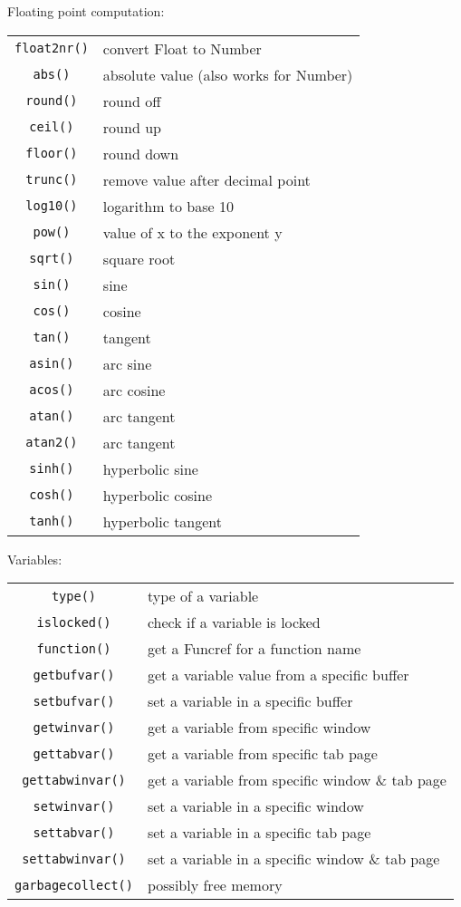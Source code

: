 Floating point computation:
\label{float-functions}
\begin{center} \begin{tabular}{c l}
				\verb!float2nr()! & convert Float to Number \\
				\verb!abs()! & absolute value (also works for Number) \\
				\verb!round()! & round off \\
				\verb!ceil()! & round up \\
				\verb!floor()! & round down \\
				\verb!trunc()! & remove value after decimal point \\
				\verb!log10()! & logarithm to base 10 \\
				\verb!pow()! & value of x to the exponent y \\
				\verb!sqrt()! & square root \\
				\verb!sin()! & sine \\
				\verb!cos()! & cosine \\
				\verb!tan()! & tangent \\
				\verb!asin()! & arc sine \\
				\verb!acos()! & arc cosine \\
				\verb!atan()! & arc tangent \\
				\verb!atan2()! & arc tangent \\
				\verb!sinh()! & hyperbolic sine \\
				\verb!cosh()! & hyperbolic cosine \\
				\verb!tanh()! & hyperbolic tangent \\
\end{tabular} \end{center}

Variables:
\label{var-functions}
\begin{center} \begin{tabular}{c l}
				\verb!type()! & type of a variable \\
				\verb!islocked()! & check if a variable is locked \\
				\verb!function()! & get a Funcref for a function name \\
				\verb!getbufvar()! & get a variable value from a specific buffer \\
				\verb!setbufvar()! & set a variable in a specific buffer \\
				\verb!getwinvar()! & get a variable from specific window \\
				\verb!gettabvar()! & get a variable from specific tab page \\
				\verb!gettabwinvar()! & get a variable from specific window \& tab page \\
				\verb!setwinvar()! & set a variable in a specific window \\
				\verb!settabvar()! & set a variable in a specific tab page \\
				\verb!settabwinvar()! & set a variable in a specific window \& tab page \\
				\verb!garbagecollect()! & possibly free memory \\
\end{tabular} \end{center}

